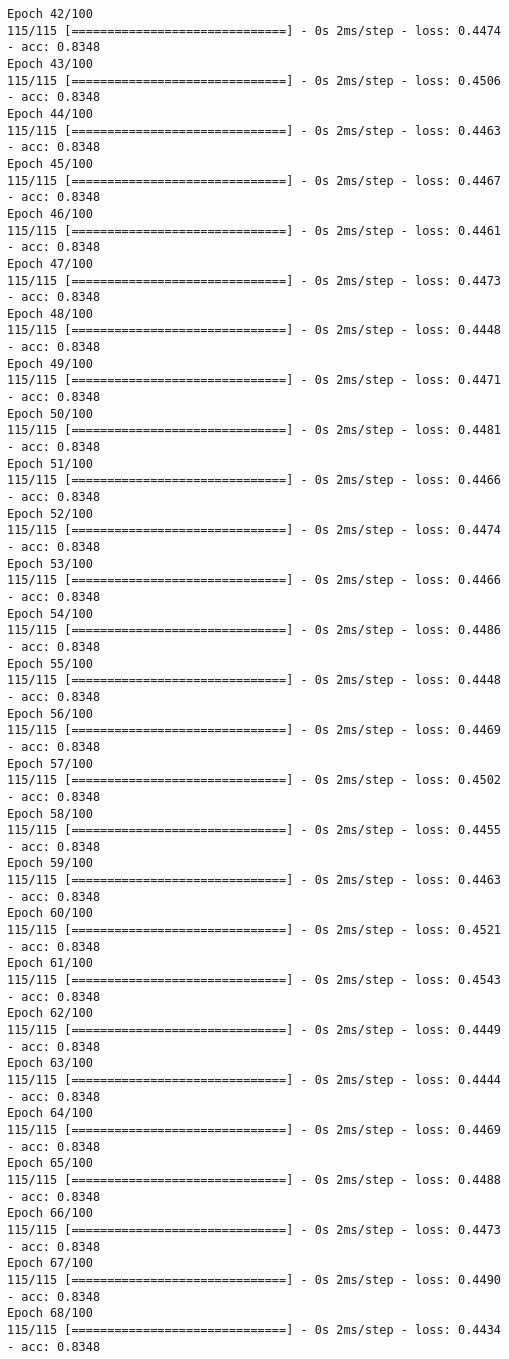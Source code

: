 \documentclass[11pt]{article}
\begin{document}
\begin{Verbatim}[commandchars=\\\{\}]
Epoch 42/100
115/115 [==============================] - 0s 2ms/step - loss: 0.4474 - acc: 0.8348
Epoch 43/100
115/115 [==============================] - 0s 2ms/step - loss: 0.4506 - acc: 0.8348
Epoch 44/100
115/115 [==============================] - 0s 2ms/step - loss: 0.4463 - acc: 0.8348
Epoch 45/100
115/115 [==============================] - 0s 2ms/step - loss: 0.4467 - acc: 0.8348
Epoch 46/100
115/115 [==============================] - 0s 2ms/step - loss: 0.4461 - acc: 0.8348
Epoch 47/100
115/115 [==============================] - 0s 2ms/step - loss: 0.4473 - acc: 0.8348
Epoch 48/100
115/115 [==============================] - 0s 2ms/step - loss: 0.4448 - acc: 0.8348
Epoch 49/100
115/115 [==============================] - 0s 2ms/step - loss: 0.4471 - acc: 0.8348
Epoch 50/100
115/115 [==============================] - 0s 2ms/step - loss: 0.4481 - acc: 0.8348
Epoch 51/100
115/115 [==============================] - 0s 2ms/step - loss: 0.4466 - acc: 0.8348
Epoch 52/100
115/115 [==============================] - 0s 2ms/step - loss: 0.4474 - acc: 0.8348
Epoch 53/100
115/115 [==============================] - 0s 2ms/step - loss: 0.4466 - acc: 0.8348
Epoch 54/100
115/115 [==============================] - 0s 2ms/step - loss: 0.4486 - acc: 0.8348
Epoch 55/100
115/115 [==============================] - 0s 2ms/step - loss: 0.4448 - acc: 0.8348
Epoch 56/100
115/115 [==============================] - 0s 2ms/step - loss: 0.4469 - acc: 0.8348
Epoch 57/100
115/115 [==============================] - 0s 2ms/step - loss: 0.4502 - acc: 0.8348
Epoch 58/100
115/115 [==============================] - 0s 2ms/step - loss: 0.4455 - acc: 0.8348
Epoch 59/100
115/115 [==============================] - 0s 2ms/step - loss: 0.4463 - acc: 0.8348
Epoch 60/100
115/115 [==============================] - 0s 2ms/step - loss: 0.4521 - acc: 0.8348
Epoch 61/100
115/115 [==============================] - 0s 2ms/step - loss: 0.4543 - acc: 0.8348
Epoch 62/100
115/115 [==============================] - 0s 2ms/step - loss: 0.4449 - acc: 0.8348
Epoch 63/100
115/115 [==============================] - 0s 2ms/step - loss: 0.4444 - acc: 0.8348
Epoch 64/100
115/115 [==============================] - 0s 2ms/step - loss: 0.4469 - acc: 0.8348
Epoch 65/100
115/115 [==============================] - 0s 2ms/step - loss: 0.4488 - acc: 0.8348
Epoch 66/100
115/115 [==============================] - 0s 2ms/step - loss: 0.4473 - acc: 0.8348
Epoch 67/100
115/115 [==============================] - 0s 2ms/step - loss: 0.4490 - acc: 0.8348
Epoch 68/100
115/115 [==============================] - 0s 2ms/step - loss: 0.4434 - acc: 0.8348

\end{Verbatim}
\end{document}
